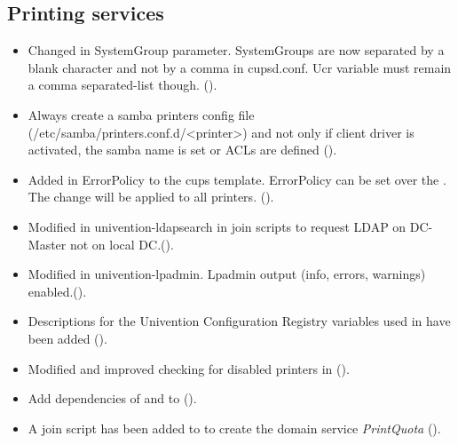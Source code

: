 \subsection{Printing services}
\begin{itemize}
\item Changed in  SystemGroup parameter. SystemGroups are now separated by a blank character and not by a comma in cupsd.conf. Ucr variable must remain a comma separated-list though. ().

\item Always create a samba printers config file
(/etc/samba/printers.conf.d/<printer>) and not only if client driver is
activated, the samba name is set or ACLs are defined ().

\item Added in  ErrorPolicy to the cups template. ErrorPolicy can be set over the . The change will be applied to all printers. ().

\item Modified in  univention-ldapsearch in join scripts to request LDAP on DC-Master not on local DC.().

\item Modified in  univention-lpadmin. Lpadmin output (info, errors, warnings) enabled.().

\item Descriptions for the Univention Configuration Registry variables used in  have been added ().

\item Modified and improved checking for disabled printers in   ().

\item Add dependencies of  and  to   ().

\item A join script has been added to  to
create the domain service \emph{PrintQuota} ().

\end{itemize}


